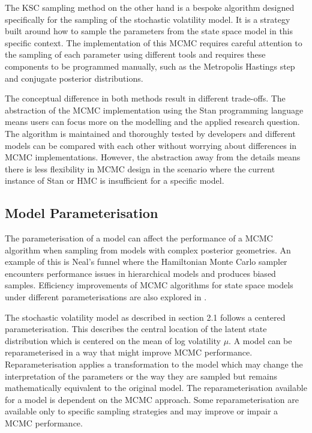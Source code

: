 \documentclass[12pt, a4paper]{article}
\begin{document}
        The KSC sampling method on the other hand is a bespoke algorithm designed specifically for the sampling of the stochastic volatility model. It is a strategy built around how to sample the parameters from the state space model in this specific context. The implementation of this MCMC requires careful attention to the sampling of each parameter using different tools and requires these components to be programmed manually, such as the Metropolis Hastings step and conjugate posterior distributions. 

        The conceptual difference in both methods result in different trade-offs. The abstraction of the MCMC implementation using the Stan programming language means users can focus more on the modelling and the applied research question. The algorithm is maintained and thoroughly tested by developers and different models can be compared with each other without worrying about differences in MCMC implementations. However, the abstraction away from the details means there is less flexibility in MCMC design in the scenario where the current instance of Stan or HMC is insufficient for a specific model.
        
    \subsection{Model Parameterisation}

        The parameterisation of a model can affect the performance of a MCMC algorithm when sampling from models with complex posterior geometries. An example of this is Neal's funnel \citep{neal2003slice} where the Hamiltonian Monte Carlo sampler encounters performance issues in hierarchical models and produces biased samples. Efficiency improvements of MCMC algorithms for state space models under different parameterisations are also explored in \citet{strickland2008parameterisation}.

        The stochastic volatility model as described in section 2.1 follows a centered parameterisation. This describes the central location of the latent state distribution which is centered on the mean of log volatility $\mu$. A model can be reparameterised in a way that might improve MCMC performance. Reparameterisation applies a transformation to the model which may change the interpretation of the parameters or the way they are sampled but remains mathematically equivalent to the original model. The reparameterisation available for a model is dependent on the MCMC approach. Some reparameterisation are available only to specific sampling strategies and may improve or impair a MCMC performance. 
\end{document}
